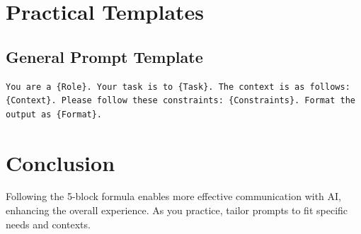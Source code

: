 \documentclass{article}
\begin{document}
\section{Practical Templates}
\subsection{General Prompt Template}
\begin{verbatim}
You are a {Role}. Your task is to {Task}. The context is as follows: {Context}. Please follow these constraints: {Constraints}. Format the output as {Format}.
\end{verbatim}
\section{Conclusion}
Following the 5-block formula enables more effective communication with AI, enhancing the overall experience. As you practice, tailor prompts to fit specific needs and contexts.
\end{document}

